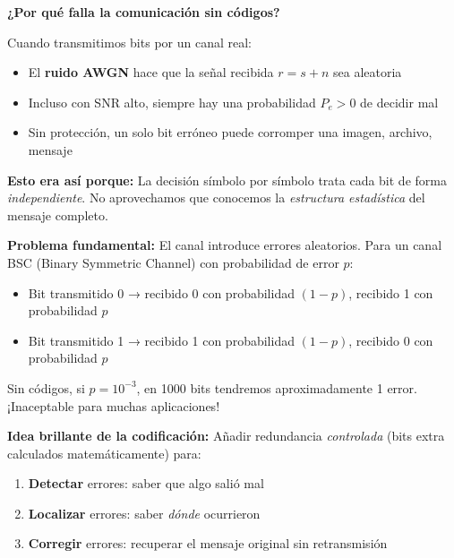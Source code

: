 \documentclass[10pt,a4paper]{article}
\begin{document}
\begin{tcolorbox}[colback=rojoclaro!10,colframe=rojoclaro,title=🧠 RECORDATORIO FUNDAMENTAL]
\textbf{¿Por qué falla la comunicación sin códigos?}

Cuando transmitimos bits por un canal real:
\begin{itemize}
\item El \textbf{ruido AWGN} hace que la señal recibida $r = s + n$ sea aleatoria
\item Incluso con SNR alto, siempre hay una probabilidad $P_e > 0$ de decidir mal
\item Sin protección, un solo bit erróneo puede corromper una imagen, archivo, mensaje
\end{itemize}

\textbf{Esto era así porque:} La decisión símbolo por símbolo trata cada bit de forma \emph{independiente}. No aprovechamos que conocemos la \emph{estructura estadística} del mensaje completo.
\end{tcolorbox}

\textbf{Problema fundamental:} El canal introduce errores aleatorios. Para un canal BSC (Binary Symmetric Channel) con probabilidad de error $p$:
\begin{itemize}
\item Bit transmitido 0 → recibido 0 con probabilidad $(1-p)$, recibido 1 con probabilidad $p$
\item Bit transmitido 1 → recibido 1 con probabilidad $(1-p)$, recibido 0 con probabilidad $p$
\end{itemize}

Sin códigos, si $p = 10^{-3}$, en 1000 bits tendremos aproximadamente 1 error. ¡Inaceptable para muchas aplicaciones!

\textbf{Idea brillante de la codificación:} Añadir redundancia \emph{controlada} (bits extra calculados matemáticamente) para:
\begin{enumerate}
\item \textbf{Detectar} errores: saber que algo salió mal
\item \textbf{Localizar} errores: saber \emph{dónde} ocurrieron
\item \textbf{Corregir} errores: recuperar el mensaje original sin retransmisión
\end{enumerate}
\end{document}
